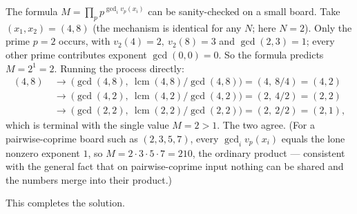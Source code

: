 \documentclass[11pt]{article}
\theoremstyle{plain}
\theoremstyle{definition}
\theoremstyle{remark}
\begin{document}
The formula $M=\prod_p p^{\gcd_i v_p(x_i)}$ can be sanity-checked on a small
board. Take $(x_1,x_2)=(4,8)$ (the mechanism is identical for any $N$; here
$N=2$). Only the prime $p=2$ occurs, with $v_2(4)=2,\ v_2(8)=3$ and
$\gcd(2,3)=1$; every other prime contributes exponent $\gcd(0,0)=0$. So the
formula predicts $M=2^{1}=2$. Running the process directly:
\begin{align*}
(4,8) &\ \to\ \bigl(\gcd(4,8),\ \operatorname{lcm}(4,8)/\gcd(4,8)\bigr)=(4,\ 8/4)=(4,2)\\
&\ \to\ \bigl(\gcd(4,2),\ \operatorname{lcm}(4,2)/\gcd(4,2)\bigr)=(2,\ 4/2)=(2,2)\\
&\ \to\ \bigl(\gcd(2,2),\ \operatorname{lcm}(2,2)/\gcd(2,2)\bigr)=(2,\ 2/2)=(2,1),
\end{align*}
which is terminal with the single value $M=2>1$. The two agree. (For a
pairwise-coprime board such as $(2,3,5,7)$, every $\gcd_i v_p(x_i)$ equals the
lone nonzero exponent $1$, so $M=2\cdot3\cdot5\cdot7=210$, the ordinary
product --- consistent with the general fact that on pairwise-coprime input
nothing can be shared and the numbers merge into their product.)

\medskip
\noindent This completes the solution.
\end{document}
